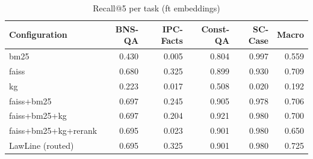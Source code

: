\begin{table}
\caption{Recall@5 per task (ft embeddings)}
\label{tab:per_task_ft}
\begin{tabular}{lrrrrr}
\toprule
Configuration & BNS-QA & IPC-Facts & Const-QA & SC-Case & Macro \\
\midrule
bm25 & 0.430 & 0.005 & 0.804 & 0.997 & 0.559 \\
faiss & 0.680 & 0.325 & 0.899 & 0.930 & 0.709 \\
kg & 0.223 & 0.017 & 0.508 & 0.020 & 0.192 \\
faiss+bm25 & 0.697 & 0.245 & 0.905 & 0.978 & 0.706 \\
faiss+bm25+kg & 0.697 & 0.204 & 0.921 & 0.980 & 0.700 \\
faiss+bm25+kg+rerank & 0.695 & 0.023 & 0.901 & 0.980 & 0.650 \\
LawLine (routed) & 0.695 & 0.325 & 0.901 & 0.980 & 0.725 \\
\bottomrule
\end{tabular}
\end{table}
